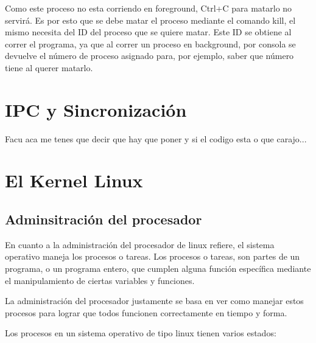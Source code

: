 \documentclass[a4paper, 12pt]{article}
\begin{document}
Como este proceso no esta corriendo en foreground, Ctrl+C para matarlo no servir\'a. Es por esto que se debe matar el proceso mediante el comando kill, el mismo necesita del ID del proceso que se quiere matar. Este ID se obtiene al correr el programa, ya que al correr un proceso en background, por consola se devuelve el n\'umero de proceso asignado para, por ejemplo, saber que n\'umero tiene al querer matarlo.

\section*{IPC y Sincronizaci\'on}


Facu aca me tenes que decir que hay que poner y si el codigo esta o que carajo...

\section*{El Kernel Linux}

\subsection*{Adminsitraci\'on del procesador}

En cuanto a la administraci\'on del procesador de linux refiere, el sistema operativo maneja los procesos o tareas. Los procesos o tareas, son partes de un programa, o un programa entero, que cumplen alguna funci\'on espec\'ifica mediante el manipulamiento de ciertas variables y funciones. 

La administraci\'on del procesador justamente se basa en ver como manejar estos procesos para lograr que todos funcionen correctamente en tiempo y forma. 

Los procesos en un sistema operativo de tipo linux tienen varios estados:
\end{document}
